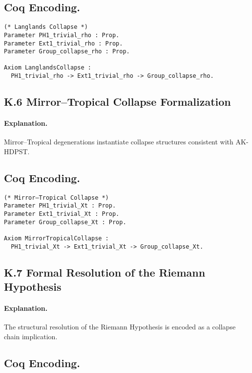 \documentclass[11pt]{article}
\begin{document}
\subsection*{Coq Encoding.}

\begin{lstlisting}[language=Coq, caption=Coq Encoding.]
(* Langlands Collapse *)
Parameter PH1_trivial_rho : Prop.
Parameter Ext1_trivial_rho : Prop.
Parameter Group_collapse_rho : Prop.

Axiom LanglandsCollapse :
  PH1_trivial_rho -> Ext1_trivial_rho -> Group_collapse_rho.
\end{lstlisting}

\subsection*{K.6 Mirror–Tropical Collapse Formalization}

\paragraph{Explanation.}  
Mirror–Tropical degenerations instantiate collapse structures consistent with AK-HDPST.

\subsection*{Coq Encoding.}

\begin{lstlisting}[language=Coq, caption=Coq Encoding.]
(* Mirror–Tropical Collapse *)
Parameter PH1_trivial_Xt : Prop.
Parameter Ext1_trivial_Xt : Prop.
Parameter Group_collapse_Xt : Prop.

Axiom MirrorTropicalCollapse :
  PH1_trivial_Xt -> Ext1_trivial_Xt -> Group_collapse_Xt.
\end{lstlisting}

\subsection*{K.7 Formal Resolution of the Riemann Hypothesis}

\paragraph{Explanation.}  
The structural resolution of the Riemann Hypothesis is encoded as a collapse chain implication.

\subsection*{Coq Encoding.}
\end{document}
